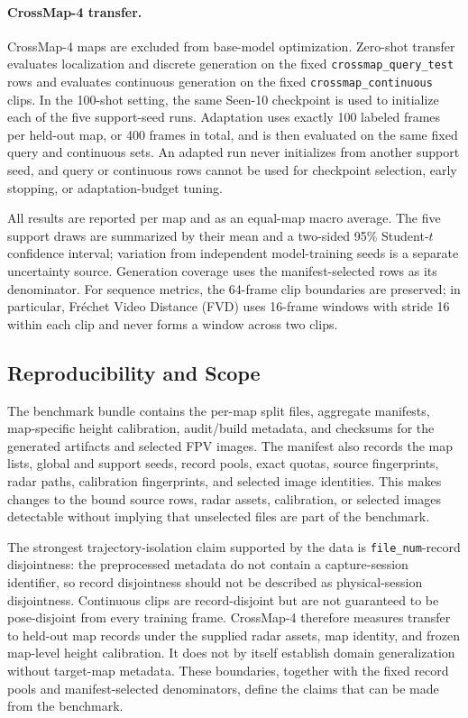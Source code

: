 \paragraph{CrossMap-4 transfer.}
CrossMap-4 maps are excluded from base-model optimization.  Zero-shot
transfer evaluates localization and discrete generation on the fixed
\texttt{crossmap\_query\_test} rows and evaluates continuous generation on
the fixed \texttt{crossmap\_continuous} clips.  In the 100-shot setting, the
same Seen-10 checkpoint is used to initialize each of the five support-seed
runs.  Adaptation uses exactly 100 labeled frames per held-out map, or 400
frames in total, and is then evaluated on the same fixed query and
continuous sets.  An adapted run never initializes from another support
seed, and query or continuous rows cannot be used for checkpoint selection,
early stopping, or adaptation-budget tuning.

All results are reported per map and as an equal-map macro average.  The
five support draws are summarized by their mean and a two-sided 95\%
Student-$t$ confidence interval; variation from independent model-training
seeds is a separate uncertainty source.  Generation coverage uses the
manifest-selected rows as its denominator.  For sequence metrics, the
64-frame clip boundaries are preserved; in particular, Fr\'echet Video
Distance (FVD) uses 16-frame windows with stride 16 within each clip and never
forms a window across two clips.

\subsection{Reproducibility and Scope}
\label{subsec:benchmark-scope}

The benchmark bundle contains the per-map split files, aggregate
manifests, map-specific height calibration, audit/build metadata, and
checksums for the generated artifacts and selected FPV images.  The manifest
also records the map lists, global and support seeds, record pools, exact
quotas, source fingerprints, radar paths, calibration fingerprints, and
selected image identities.  This makes changes to the bound source rows,
radar assets, calibration, or selected images detectable without implying
that unselected files are part of the benchmark.

The strongest trajectory-isolation claim supported by the data is
\texttt{file\_num}-record disjointness: the preprocessed metadata do not
contain a capture-session identifier, so record disjointness should not be
described as physical-session disjointness.  Continuous clips are
record-disjoint but are not guaranteed to be pose-disjoint from every
training frame.  CrossMap-4 therefore measures transfer to held-out map
records under the supplied radar assets, map identity, and frozen map-level
height calibration.  It does not by itself establish domain generalization
without target-map metadata.  These boundaries, together with the fixed
record pools and manifest-selected denominators, define the claims that can
be made from the benchmark.
